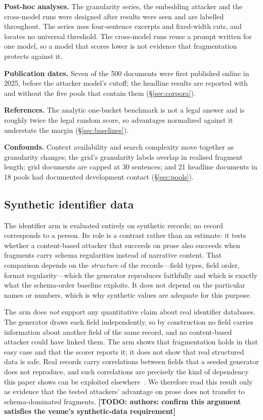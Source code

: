 \documentclass[sigconf,review]{acmart}
\newcommand{\TODO}[1]{\textbf{[TODO: #1]}}
\begin{document}
\textbf{Post-hoc analyses.} The granularity series, the embedding attacker and
the cross-model runs were designed after results were seen and are labelled
throughout. The series uses four-sentence excerpts and fixed-width cuts, and
locates no universal threshold. The cross-model runs reuse a prompt written for
one model, so a model that scores lower is not evidence that fragmentation
protects against it.

\textbf{Publication dates.} Seven of the 500 documents were first published
online in 2025, before the attacker model's cutoff; the headline results are
reported with and without the five pools that contain them
(\S\ref{sec:corpora}).

\textbf{References.} The analytic one-bucket benchmark is not a legal answer
and is roughly twice the legal random score, so advantages normalized against
it understate the margin (\S\ref{sec:baselines}).

\textbf{Confounds.} Context availability and search complexity move together
as granularity changes; the grid's granularity labels overlap in realised
fragment length; grid documents are capped at 30 sentences; and 21 headline
documents in 18 pools had documented development contact
(\S\ref{sec:pools}).

\subsection{Synthetic identifier data}
\label{sec:synthetic}
The identifier arm is evaluated entirely on synthetic records; no record
corresponds to a person. Its role is a contrast rather than an estimate: it
tests whether a content-based attacker that succeeds on prose also succeeds
when fragments carry schema regularities instead of narrative content. That
comparison depends on the \emph{structure} of the records---field types, field
order, format regularity---which the generator reproduces faithfully and which
is exactly what the schema-order baseline exploits. It does not depend on the
particular names or numbers, which is why synthetic values are adequate for
this purpose.

The arm does \emph{not} support any quantitative claim about real identifier
databases. The generator draws each field independently, so by construction no
field carries information about another field of the same record, and no
content-based attacker could have linked them. The arm shows that
fragmentation holds in that easy case and that the scorer reports it; it does
not show that real structured data is safe. Real records carry correlations
between fields that a seeded generator does not reproduce, and such
correlations are precisely the kind of dependency this paper shows can be
exploited elsewhere~\cite{decapitani2014}. We therefore read this
result only as evidence that the tested attackers' advantage on prose does not
transfer to schema-dominated fragments. \TODO{authors: confirm this argument
satisfies the venue's synthetic-data requirement}
\end{document}
